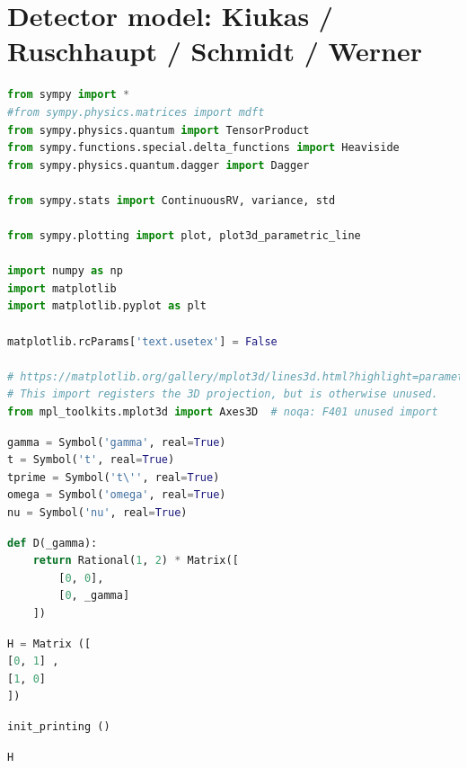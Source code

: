 \graphicspath{{tex/appendix/nb/jupyter/detect/}}

\hypertarget{detector-model-kiukas-ruschhaupt-schmidt-werner}{%
\section{Detector model: Kiukas / Ruschhaupt / Schmidt /
Werner}\label{detector-model-kiukas-ruschhaupt-schmidt-werner}}

\begin{lstlisting}[language=Python]
from sympy import *
#from sympy.physics.matrices import mdft
from sympy.physics.quantum import TensorProduct
from sympy.functions.special.delta_functions import Heaviside
from sympy.physics.quantum.dagger import Dagger

from sympy.stats import ContinuousRV, variance, std

from sympy.plotting import plot, plot3d_parametric_line

import numpy as np
import matplotlib
import matplotlib.pyplot as plt

matplotlib.rcParams['text.usetex'] = False

# https://matplotlib.org/gallery/mplot3d/lines3d.html?highlight=parametric
# This import registers the 3D projection, but is otherwise unused.
from mpl_toolkits.mplot3d import Axes3D  # noqa: F401 unused import
\end{lstlisting}

\begin{lstlisting}[language=Python]
gamma = Symbol('gamma', real=True)
t = Symbol('t', real=True)
tprime = Symbol('t\'', real=True)
omega = Symbol('omega', real=True)
nu = Symbol('nu', real=True)
\end{lstlisting}

\begin{lstlisting}[language=Python]
def D(_gamma):
    return Rational(1, 2) * Matrix([
        [0, 0],
        [0, _gamma]
    ])
\end{lstlisting}

\begin{lstlisting}[language=Python]
H = Matrix ([
[0, 1] ,
[1, 0]
])
\end{lstlisting}

\begin{lstlisting}[language=Python]
init_printing ()
\end{lstlisting}

\begin{lstlisting}[language=Python]
H
\end{lstlisting}

